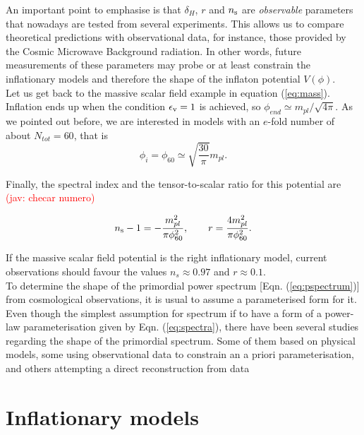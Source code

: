 \documentclass{rmaa}
\def\beq{\begin{equation}}
\def\eeq{\end{equation}}
\newcommand{\jav}[1]{\textcolor{red}{(jav: #1)}}
\begin{document}
An important point to emphasise is that  $\delta_H$, $r$ and $n_{\rm s}$ are {\em observable} 
parameters that nowadays are tested from several experiments. 
This allows us to compare theoretical predictions with observational data,  
for instance, those provided by the Cosmic Microwave Background radiation. 
In other words, future measurements of these parameters may
probe or at least constrain the inflationary models and therefore the shape of the inflaton potential $V(\phi)$.
\\

Let us get back to the massive scalar field example in equation  (\ref{eq:mass}).
%
Inflation ends up when the condition $\epsilon_{\rm v}=1$ is achieved, so $\phi_{end}\simeq m_{pl}/\sqrt{4 \pi}$.
 As we pointed out before, we are interested in models with an $e$-fold number of about $N_{tot}=60$, that is
 \beq
 \phi_i=\phi_{60}\simeq \sqrt{\frac{30}{\pi}}m_{pl}.
 \eeq
 
 \noindent
 Finally, the spectral index and the tensor-to-scalar ratio for this potential are \jav{checar numero}
 
 \beq
 n_{\rm s}-1= -\frac{m_{pl}^2}{\pi \phi_{60}^2}, \qquad r= \frac{4m_{pl}^2}{\pi \phi_{60}^2}.
 \eeq

\noindent
If the massive scalar field potential is the right inflationary model, current observations should favour
the values $n_s\approx 0.97$ and $r\approx 0.1$.
\\

To determine the shape of the primordial power spectrum [Eqn. (\ref{eq:pspectrum})]
from cosmological observations, it is usual to assume a
parameterised form for it. Even though the simplest assumption for
spectrum if to have a form of a power-law parameterisation given by Eqn. (\ref{eq:spectra}),
there have been several studies regarding the shape of the
primordial spectrum. Some of them based on physical models, some using
observational data to constrain an a priori parameterisation, and others
attempting a direct reconstruction from data \citep{Hlozek, Vazquez1, Vazquez2, Guo, Vazquez3}

\section{Inflationary models}
\end{document}
